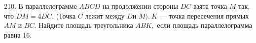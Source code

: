 210. В параллелограмме $ABCD$ на продолжении стороны $DC$ взята точка $M$ так, что $DM=4DC.$ (Точка $C$
лежит между $D$и $M).\ K$ --- точка пересечения прямых $AM$ и $BC.$ Найдите площадь треугольника $ABK,$ если
площадь параллелограмма равна 16.\\
